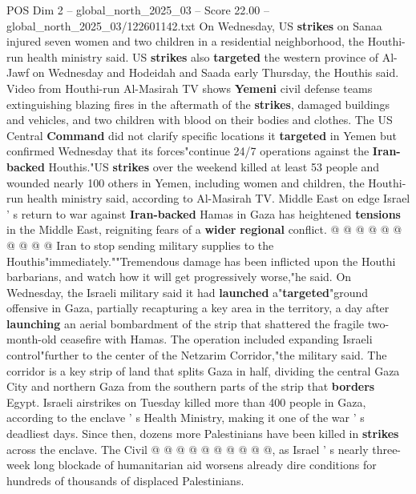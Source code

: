 \begin{textsample}{POS Dim 2 – global\_north\_2025\_03 – Score 22.00 – global\_north\_2025\_03/122601142.txt}
On Wednesday, US \textbf{strikes} on Sanaa injured seven women and two children in a residential neighborhood, the Houthi-run health ministry said.
US \textbf{strikes} also \textbf{targeted} the western province of Al-Jawf on Wednesday and Hodeidah and Saada early Thursday, the Houthis said.
Video from Houthi-run Al-Masirah TV shows \textbf{Yemeni} civil defense teams extinguishing blazing fires in the aftermath of the \textbf{strikes}, damaged buildings and vehicles, and two children with blood on their bodies and clothes.
The US Central \textbf{Command} did not clarify specific locations it \textbf{targeted} in Yemen but confirmed Wednesday that its forces"continue 24/7 operations against the \textbf{Iran-backed} Houthis."US \textbf{strikes} over the weekend killed at least 53 people and wounded nearly 100 others in Yemen, including women and children, the Houthi-run health ministry said, according to Al-Masirah TV.
Middle East on edge Israel ' s return to war against \textbf{Iran-backed} Hamas in Gaza has heightened \textbf{tensions} in the Middle East, reigniting fears of a \textbf{wider} \textbf{regional} conflict. @ @ @ @ @ @ @ @ @ @ Iran to stop sending military supplies to the Houthis"immediately.""Tremendous damage has been inflicted upon the Houthi barbarians, and watch how it will get progressively worse,"he said.
On Wednesday, the Israeli military said it had \textbf{launched} a"\textbf{targeted}"ground offensive in Gaza, partially recapturing a key area in the territory, a day after \textbf{launching} an aerial bombardment of the strip that shattered the fragile two-month-old ceasefire with Hamas.
The operation included expanding Israeli control"further to the center of the Netzarim Corridor,"the military said.
The corridor is a key strip of land that splits Gaza in half, dividing the central Gaza City and northern Gaza from the southern parts of the strip that \textbf{borders} Egypt.
Israeli airstrikes on Tuesday killed more than 400 people in Gaza, according to the enclave ' s Health Ministry, making it one of the war ' s deadliest days.
Since then, dozens more Palestinians have been killed in \textbf{strikes} across the enclave.
The Civil @ @ @ @ @ @ @ @ @ @, as Israel ' s nearly three-week long blockade of humanitarian aid worsens already dire conditions for hundreds of thousands of displaced Palestinians.

\end{textsample}
